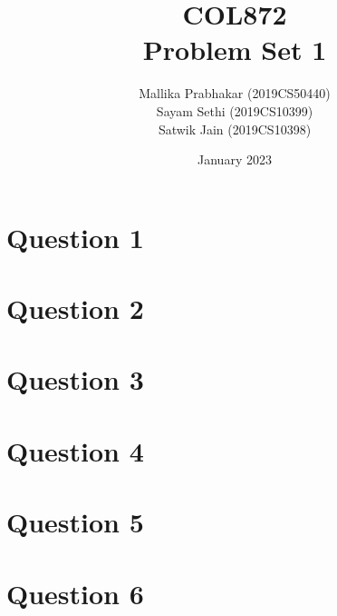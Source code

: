 \documentclass[11pt]{article}
\title{COL872\\Problem Set 1}
\author{Mallika Prabhakar (2019CS50440)\\Sayam Sethi (2019CS10399)\\Satwik Jain (2019CS10398)}
\date{January 2023}
\begin{document}
\maketitle

\tableofcontents


\newpage
\section{Question 1}



\newpage
\section{Question 2}



\newpage
\section{Question 3}


\newpage
\section{Question 4}



\newpage
\section{Question 5}



\newpage
\section{Question 6}

\end{document}
